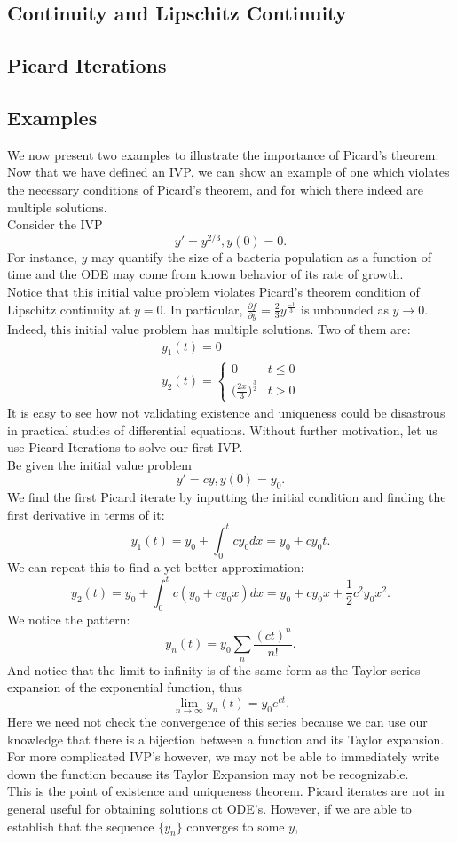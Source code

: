 \documentclass[11pt]{article}
\newcommand{\1}{\mathbf{1}}
\newcommand{\0}{\mathbf{0}}
\begin{document}
\subsection{Continuity and Lipschitz Continuity}
\subsection{Picard Iterations}
\subsection{Examples}
We now present two examples to illustrate the importance of Picard's theorem. Now that we have defined an IVP, we can show an example of one which violates the necessary conditions of Picard's theorem, and for which there indeed are multiple solutions.\\
Consider the IVP \[
y'=y^{2/3}, y(0)=0
.\]
For instance, $y$ may quantify the size of a bacteria population as a function of time and the ODE may come from known behavior of its rate of growth.\\
Notice that this initial value problem violates Picard's theorem condition of Lipschitz continuity at  $y=0$. In particular,  $\frac{\partial f}{\partial y}=\frac{2}{3}y^{\frac{-1}{3}}$ is unbounded as $y\to 0$.\\
Indeed, this initial value problem has multiple solutions. Two of them are:
\begin{align}
	y_1(t)=0\\
	y_2(t) = \begin{cases}
		0 & t\leq 0 \\
		\big(\frac{2x}{3}\big)^{\frac{3}{2}} & t>0
		\end{cases}
\end{align}
It is easy to see how not validating existence and uniqueness could be disastrous in practical studies of differential equations. Without further motivation, let us use Picard Iterations to solve our first IVP.\\
Be given the initial value problem \[
y'=cy, y(0)=y_0
.\] 
We find the first Picard iterate by inputting the initial condition and finding the first derivative in terms of it:
\[
y_1(t)=y_0+\int_{0}^{t}cy_0dx=y_0+cy_0t
.\] 
We can repeat this to find a yet better approximation: \[
y_2(t)=y_0+\int_{0}^{t}c(y_0+cy_0x)dx=y_0+cy_0x+\frac{1}{2}c^2y_0x^2
.\] 
We notice the pattern: \[
y_n(t)=y_0\sum_{n}\frac{(ct)^n}{n!}
.\] 
And notice that the limit to infinity is of the same form as the Taylor series expansion of the exponential function, thus \[
\lim_{n\to\infty}y_n(t)=y_0e^{ct}
.\]
Here we need not check the convergence of this series because we can use our knowledge that there is a bijection between a function and its Taylor expansion.\\
For more complicated IVP's however, we may not be able to immediately write down the function because its Taylor Expansion may not be recognizable.\\
This is the point of existence and uniqueness theorem. Picard iterates are not in general useful for obtaining solutions ot ODE's. However, if we are able to establish that the sequence $\{y_n\}$ converges to some $y$,
\end{document}
